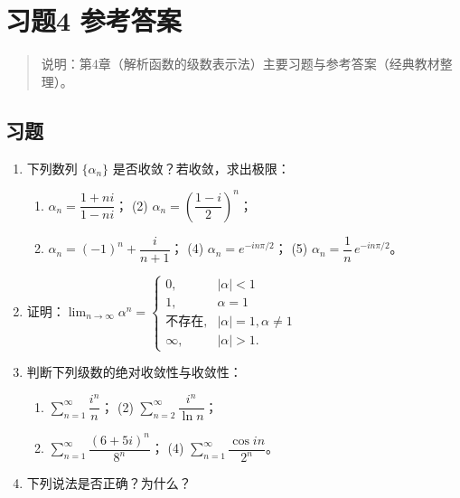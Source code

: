 \chapter{习题4 参考答案}\label{ux4e60ux98984-ux53c2ux8003ux7b54ux6848}

\begin{quote}
说明：第4章（解析函数的级数表示法）主要习题与参考答案（经典教材整理）。
\end{quote}

\section{习题}\label{ux4e60ux9898-3}

\begin{enumerate}
\def\labelenumi{\arabic{enumi}.}
\item
  下列数列 \(\{\alpha_n\}\) 是否收敛？若收敛，求出极限：

  \begin{enumerate}
  \def\labelenumii{(\arabic{enumii})}
  \tightlist
  \item
    \(\alpha_n=\dfrac{1+ni}{1-ni}\)； (2)
    \(\alpha_n=\left(\dfrac{1-i}{2}\right)^n\)；
  \item
    \(\alpha_n=(-1)^n+\dfrac{i}{n+1}\)； (4) \(\alpha_n=e^{-in\pi/2}\)；
    (5) \(\alpha_n=\dfrac1n\,e^{-in\pi/2}\)。
  \end{enumerate}
\item
  证明：\(\lim_{n\to\infty}\alpha^n=\begin{cases}0,&|\alpha|<1\\1,&\alpha=1\\\text{不存在},&|\alpha|=1,\alpha\neq1\\\infty,&|\alpha|>1.\end{cases}\)
\item
  判断下列级数的绝对收敛性与收敛性：

  \begin{enumerate}
  \def\labelenumii{(\arabic{enumii})}
  \tightlist
  \item
    \(\sum_{n=1}^\infty\dfrac{i^n}{n}\)； (2)
    \(\sum_{n=2}^\infty\dfrac{i^n}{\ln n}\)；
  \item
    \(\sum_{n=1}^\infty\dfrac{(6+5i)^n}{8^n}\)； (4)
    \(\sum_{n=1}^\infty\dfrac{\cos in}{2^n}\)。
  \end{enumerate}
\item
  下列说法是否正确？为什么？


\end{enumerate}
